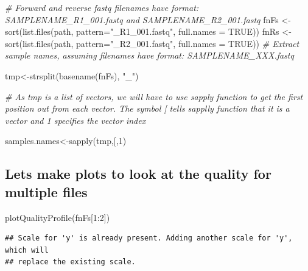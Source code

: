 \documentclass[
]{book}
\newenvironment{Shaded}{\begin{snugshade}}{\end{snugshade}}
\newcommand{\AttributeTok}[1]{\textcolor[rgb]{0.77,0.63,0.00}{#1}}
\newcommand{\CommentTok}[1]{\textcolor[rgb]{0.56,0.35,0.01}{\textit{#1}}}
\newcommand{\ConstantTok}[1]{\textcolor[rgb]{0.00,0.00,0.00}{#1}}
\newcommand{\DecValTok}[1]{\textcolor[rgb]{0.00,0.00,0.81}{#1}}
\newcommand{\FunctionTok}[1]{\textcolor[rgb]{0.00,0.00,0.00}{#1}}
\newcommand{\NormalTok}[1]{#1}
\newcommand{\OtherTok}[1]{\textcolor[rgb]{0.56,0.35,0.01}{#1}}
\newcommand{\SpecialCharTok}[1]{\textcolor[rgb]{0.00,0.00,0.00}{#1}}
\newcommand{\StringTok}[1]{\textcolor[rgb]{0.31,0.60,0.02}{#1}}
\begin{document}
\begin{Shaded}
\begin{Highlighting}[]
\CommentTok{\# Forward and reverse fastq filenames have format: SAMPLENAME\_R1\_001.fastq and SAMPLENAME\_R2\_001.fastq}
\NormalTok{fnFs }\OtherTok{\textless{}{-}} \FunctionTok{sort}\NormalTok{(}\FunctionTok{list.files}\NormalTok{(path, }\AttributeTok{pattern=}\StringTok{"\_R1\_001.fastq"}\NormalTok{, }\AttributeTok{full.names =} \ConstantTok{TRUE}\NormalTok{))}
\NormalTok{fnRs }\OtherTok{\textless{}{-}} \FunctionTok{sort}\NormalTok{(}\FunctionTok{list.files}\NormalTok{(path, }\AttributeTok{pattern=}\StringTok{"\_R2\_001.fastq"}\NormalTok{, }\AttributeTok{full.names =} \ConstantTok{TRUE}\NormalTok{))}
\CommentTok{\# Extract sample names, assuming filenames have format: SAMPLENAME\_XXX.fastq}


\NormalTok{tmp}\OtherTok{\textless{}{-}}\FunctionTok{strsplit}\NormalTok{(}\FunctionTok{basename}\NormalTok{(fnFs), }\StringTok{"\_"}\NormalTok{)}


\CommentTok{\# As tmp is a list of vectors, we will have to use sapply function to get the first position out from each vector. The symbol \textquotesingle{}[\textquotesingle{} tells sapplly function that it is a vector and 1 specifies the vector index}

\NormalTok{samples.names}\OtherTok{\textless{}{-}}\FunctionTok{sapply}\NormalTok{(tmp,}\StringTok{\textquotesingle{}[\textquotesingle{}}\NormalTok{,}\DecValTok{1}\NormalTok{)}
\end{Highlighting}
\end{Shaded}

\hypertarget{lets-make-plots-to-look-at-the-quality-for-multiple-files}{%
\subsection{Lets make plots to look at the quality for multiple files}\label{lets-make-plots-to-look-at-the-quality-for-multiple-files}}

\begin{Shaded}
\begin{Highlighting}[]
\FunctionTok{plotQualityProfile}\NormalTok{(fnFs[}\DecValTok{1}\SpecialCharTok{:}\DecValTok{2}\NormalTok{])}
\end{Highlighting}
\end{Shaded}

\begin{verbatim}
## Scale for 'y' is already present. Adding another scale for 'y', which will
## replace the existing scale.
\end{verbatim}
\end{document}
